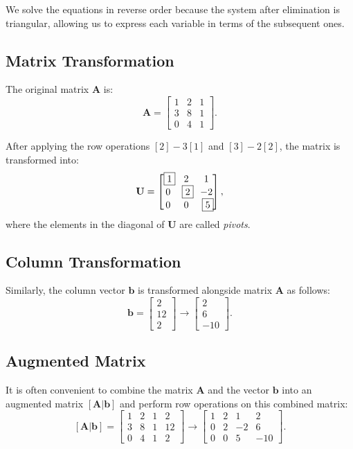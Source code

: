 We solve the equations in reverse order because the system after elimination is triangular, allowing us to express each variable in terms of the subsequent ones.


\subsection*{Matrix Transformation}

The original matrix \( \mathbf{A} \) is:
\[
\mathbf{A} =
\begin{bmatrix}
    1 & 2 & 1 \\
    3 & 8 & 1 \\
    0 & 4 & 1
\end{bmatrix}.
\]

After applying the row operations \([2] - 3[1]\) and \([3] - 2[2]\), the matrix is transformed into:
\[
\mathbf{U} =
\begin{bmatrix}
    \boxeditem{1} & 2 & 1 \\
    0 & \boxeditem{2} & -2 \\
    0 & 0 & \boxeditem{5}
\end{bmatrix},
\]
where the elements in the diagonal of \( \mathbf{U} \) are called \textit{pivots}.

\subsection*{Column Transformation}

Similarly, the column vector \( \mathbf{b} \) is transformed alongside matrix \( \mathbf{A} \) as follows:
\[
\mathbf{b} =
\begin{bmatrix}
    2 \\
    12 \\
    2
\end{bmatrix}
\rightarrow
\begin{bmatrix}
    2 \\
    6 \\
    -10
\end{bmatrix}.
\]

\subsection*{Augmented Matrix}

It is often convenient to combine the matrix \( \mathbf{A} \) and the vector \( \mathbf{b} \) into an augmented matrix \( [ \mathbf{A} | \mathbf{b} ] \) and perform row operations on this combined matrix:
\[
[\mathbf{A}|\mathbf{b}] =
\left[
\begin{array}{ccc|c}
    1 & 2 & 1 & 2 \\
    3 & 8 & 1 & 12 \\
    0 & 4 & 1 & 2
\end{array}
\right]
\rightarrow
\left[
\begin{array}{ccc|c}
    1 & 2 & 1 & 2 \\
    0 & 2 & -2 & 6 \\
    0 & 0 & 5 & -10
\end{array}
\right].
\]

